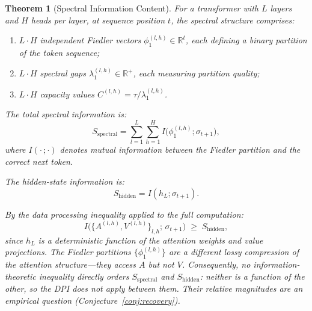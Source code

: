 \documentclass[11pt]{article}
\newtheorem{theorem}[definition]{Theorem}
\theoremstyle{remark}
\newcommand{\R}{\mathbb{R}}
\begin{document}
\begin{theorem}[Spectral Information Content]\label{thm:info_bound}
For a transformer with $L$ layers and $H$ heads per layer, at 
sequence position $t$, the spectral structure comprises:
\begin{enumerate}[nosep,label=(\roman*)]
  \item $L \cdot H$ independent Fiedler vectors 
    $\phi_1^{(l,h)} \in \R^t$, each defining a binary 
    partition of the token sequence;
  \item $L \cdot H$ spectral gaps $\lambda_1^{(l,h)} \in \R^+$, 
    each measuring partition quality;
  \item $L \cdot H$ capacity values 
    $C^{(l,h)} = \tau / \lambda_1^{(l,h)}$.
\end{enumerate}
The total spectral information is:
\begin{equation}\label{eq:spectral_info}
  S_{\text{spectral}} = \sum_{l=1}^{L} \sum_{h=1}^{H} 
  I\bigl(\phi_1^{(l,h)}; \sigma_{t+1}\bigr),
\end{equation}
where $I(\cdot\,;\cdot)$ denotes mutual information between the 
Fiedler partition and the correct next token.

The hidden-state information is:
\begin{equation}\label{eq:hidden_info}
  S_{\text{hidden}} = I(h_L; \sigma_{t+1}).
\end{equation}

By the data processing inequality applied to the full 
computation:
\begin{equation}\label{eq:dpi_full}
  I\bigl(\{A^{(l,h)}, V^{(l,h)}\}_{l,h};\, \sigma_{t+1}\bigr) 
  \;\geq\; S_{\text{hidden}},
\end{equation}
since $h_L$ is a deterministic function of the attention 
weights and value projections. The Fiedler partitions 
$\{\phi_1^{(l,h)}\}$ are a \emph{different} lossy compression 
of the attention structure---they access $A$ but not $V$. 
Consequently, no information-theoretic inequality directly 
orders $S_{\text{spectral}}$ and $S_{\text{hidden}}$: neither 
is a function of the other, so the DPI does not apply 
between them. Their relative magnitudes are an empirical 
question (Conjecture~\ref{conj:recovery}).
\end{theorem}
\end{document}
